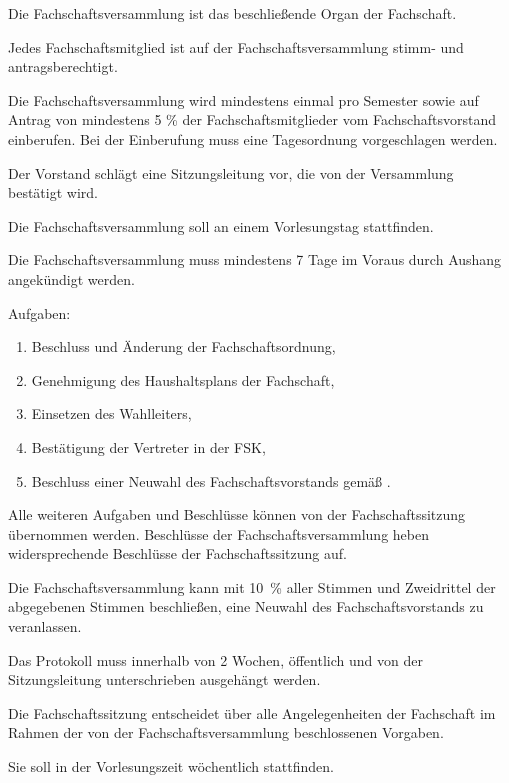 \documentclass[a4paper,parskip=half,numbers=noenddot]{scrartcl}
\begin{document}
\begin{contract}
Die Fachschaftsversammlung ist das beschließende Organ der Fachschaft.

Jedes Fachschaftsmitglied ist auf der Fachschaftsversammlung stimm- und antragsberechtigt.

Die Fachschaftsversammlung wird mindestens einmal pro Semester sowie auf Antrag von mindestens 5 \% der Fachschaftsmitglieder vom Fachschaftsvorstand einberufen. Bei der Einberufung muss eine Tagesordnung vorgeschlagen werden.

Der Vorstand schlägt eine Sitzungsleitung vor, die von der Versammlung bestätigt wird.

Die Fachschaftsversammlung soll an einem Vorlesungstag stattfinden. 

Die Fachschaftsversammlung muss mindestens 7 Tage im Voraus durch Aushang angekündigt werden.

Aufgaben: \label{fachschaft:vv:kompetenzen}
  \begin{enumerate}
  \item Beschluss und Änderung der Fachschaftsordnung,
  \item Genehmigung des Haushaltsplans der Fachschaft, 
  \item Einsetzen des Wahlleiters, \label{fachschaft:vv:wahlleiter}
  \item Bestätigung der Vertreter in der FSK,
  \item Beschluss einer Neuwahl des Fachschaftsvorstands gemäß . \label{fachschaft:vv:kompetenzen:abwahl}
 
  \end{enumerate}

Alle weiteren Aufgaben und Beschlüsse können von der Fachschaftssitzung übernommen werden. Beschlüsse der Fachschaftsversammlung heben widersprechende Beschlüsse der Fachschaftssitzung auf.

Die Fachschaftsversammlung kann mit 10~\% aller Stimmen und Zweidrittel der abgegebenen Stimmen be\-schlie\-ßen, eine Neuwahl des Fach\-schaftsvor\-stands zu veranlassen\label{fachschaft:vv:wahl}.

Das Protokoll muss innerhalb von 2 Wochen, öffentlich und von der Sitzungsleitung unterschrieben ausgehängt werden. 

\label{fs:sitzung}

Die Fachschaftssitzung entscheidet über alle Angelegenheiten der Fachschaft im Rahmen der von der Fachschaftsversammlung beschlossenen Vorgaben. 

Sie soll in der Vorlesungszeit wöchentlich stattfinden.


\end{contract}
\end{document}
